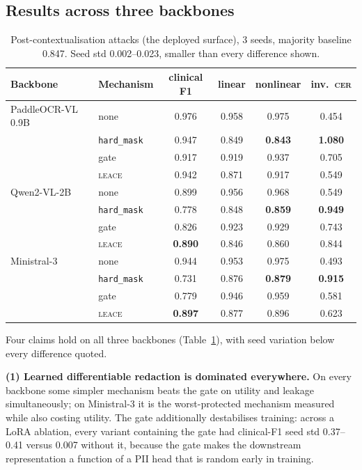 \documentclass[11pt]{article}
\newcommand{\cer}{\textsc{cer}}
\newcommand{\hardmask}{\texttt{hard\_mask}}
\newcommand{\leace}{\textsc{leace}}
\begin{document}
\subsection{Results across three backbones}

\begin{table}[t]
\centering\small
\caption{Post-contextualisation attacks (the deployed surface), 3 seeds,
majority baseline 0.847. Seed std 0.002--0.023, smaller than every
difference shown.}
\label{tab:redact}
\begin{tabular}{llcccc}
\toprule
Backbone & Mechanism & clinical F1 & linear & nonlinear & inv.\ \cer{} \\
\midrule
PaddleOCR-VL 0.9B & none      & 0.976 & 0.958 & 0.975 & 0.454 \\
                  & \hardmask & 0.947 & 0.849 & \textbf{0.843} & \textbf{1.080} \\
                  & gate      & 0.917 & 0.919 & 0.937 & 0.705 \\
                  & \leace    & 0.942 & 0.871 & 0.917 & 0.549 \\
\midrule
Qwen2-VL-2B       & none      & 0.899 & 0.956 & 0.968 & 0.549 \\
                  & \hardmask & 0.778 & 0.848 & \textbf{0.859} & \textbf{0.949} \\
                  & gate      & 0.826 & 0.923 & 0.929 & 0.743 \\
                  & \leace    & \textbf{0.890} & 0.846 & 0.860 & 0.844 \\
\midrule
Ministral-3       & none      & 0.944 & 0.953 & 0.975 & 0.493 \\
                  & \hardmask & 0.731 & 0.876 & \textbf{0.879} & \textbf{0.915} \\
                  & gate      & 0.779 & 0.946 & 0.959 & 0.581 \\
                  & \leace    & \textbf{0.897} & 0.877 & 0.896 & 0.623 \\
\bottomrule
\end{tabular}
\end{table}

Four claims hold on all three backbones (Table~\ref{tab:redact}), with seed
variation below every difference quoted.

\textbf{(1) Learned differentiable redaction is dominated everywhere.} On
every backbone some simpler mechanism beats the gate on utility and leakage
simultaneously; on Ministral-3 it is the worst-protected mechanism measured
while also costing utility. The gate additionally destabilises training:
across a LoRA ablation, every variant containing the gate had clinical-F1
seed std 0.37--0.41 versus 0.007 without it, because the gate makes the
downstream representation a function of a PII head that is random early in
training.
\end{document}
